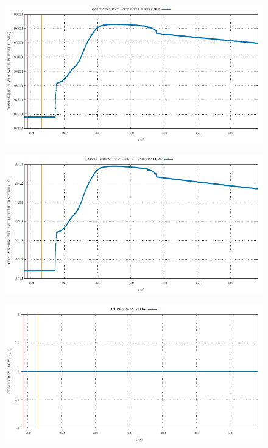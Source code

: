 \documentclass{article}
\begin{document}
\begin{multicols}{2}
\begin{figure}[H]
\end{figure}
\begin{figure}[H]
\centering
\includegraphics[width=\linewidth]{./graphs/CONTAINMENT WET WELL PRESSURE_comp.pdf}
\end{figure}
\begin{figure}[H]
\centering
\includegraphics[width=\linewidth]{./graphs/CONTAINMENT WET WELL TEMPERATURE_comp.pdf}
\end{figure}
\begin{figure}[H]
\centering
\includegraphics[width=\linewidth]{./graphs/CORE SPRAY FLOW_comp.pdf}

\end{figure}
\end{multicols}
\end{document}
